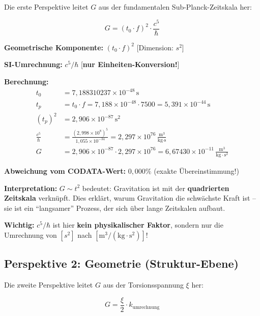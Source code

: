 	Die erste Perspektive leitet \(G\) aus der fundamentalen Sub-Planck-Zeitskala her:
	
	\begin{equation}
		\boxed{G = (t_0 \cdot f)^2 \cdot \frac{c^5}{\hbar}}
	\end{equation}
	
	\textbf{Geometrische Komponente:} \((t_0 \cdot f)^2\) [Dimension: \(s^2\)]
	
	\textbf{SI-Umrechnung:} \(c^5/\hbar\) [\textbf{nur Einheiten-Konversion!}]
	
	\textbf{Berechnung:}
	\begin{align}
		t_0 &= 7{,}188310237 \times 10^{-48}\,\text{s} \\
		t_p &= t_0 \cdot f = 7{,}188 \times 10^{-48} \cdot 7500 = 5{,}391 \times 10^{-44}\,\text{s} \\
		(t_p)^2 &= 2{,}906 \times 10^{-87}\,\text{s}^2 \\
		\frac{c^5}{\hbar} &= \frac{(2{,}998 \times 10^8)^5}{1{,}055 \times 10^{-34}} = 2{,}297 \times 10^{76}\,\frac{\text{m}^3}{\text{kg} \cdot \text{s}} \\
		G &= 2{,}906 \times 10^{-87} \cdot 2{,}297 \times 10^{76} = 6{,}67430 \times 10^{-11}\,\frac{\text{m}^3}{\text{kg} \cdot \text{s}^2}
	\end{align}
	
	\textbf{Abweichung vom CODATA-Wert:} \(0{,}000\%\) (exakte Übereinstimmung!)
	
	\textbf{Interpretation:} \(G \sim t^2\) bedeutet: Gravitation ist mit der \textbf{quadrierten Zeitskala} verknüpft. Dies erklärt, warum Gravitation die schwächste Kraft ist -- sie ist ein \enquote{langsamer} Prozess, der sich über lange Zeitskalen aufbaut.
	
	\textbf{Wichtig:} \(c^5/\hbar\) ist hier \textbf{kein physikalischer Faktor}, sondern nur die Umrechnung von \([s^2]\) nach \([\text{m}^3/(\text{kg} \cdot \text{s}^2)]\)!
	
	\subsection{Perspektive 2: Geometrie (Struktur-Ebene)}
	
	Die zweite Perspektive leitet \(G\) aus der Torsionsspannung \(\xi\) her:
	
	\begin{equation}
		\boxed{G = \frac{\xi}{2} \cdot k_{\text{umrechnung}}}
	\end{equation}
	
